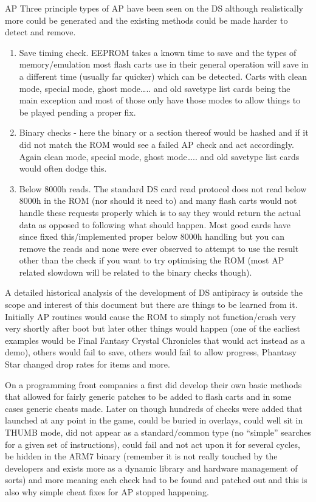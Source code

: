 \documentclass[
]{book}
\providecommand{\tightlist}{%
  \setlength{\itemsep}{0pt}\setlength{\parskip}{0pt}}
\begin{document}
AP Three principle types of AP have been seen on the DS although realistically more could be generated and the existing methods could be made harder to detect and remove.

\begin{enumerate}
\def\labelenumi{\arabic{enumi}.}
\tightlist
\item
  Save timing check. EEPROM takes a known time to save and the types of memory/emulation most flash carts use in their general operation will save in a different time (usually far quicker) which can be detected. Carts with clean mode, special mode, ghost mode\ldots.. and old savetype list cards being the main exception and most of those only have those modes to allow things to be played pending a proper fix.
\item
  Binary checks - here the binary or a section thereof would be hashed and if it did not match the ROM would see a failed AP check and act accordingly. Again clean mode, special mode, ghost mode\ldots.. and old savetype list cards would often dodge this.
\item
  Below 8000h reads. The standard DS card read protocol does not read below 8000h in the ROM (nor should it need to) and many flash carts would not handle these requests properly which is to say they would return the actual data as opposed to following what should happen. Most good cards have since fixed this/implemented proper below 8000h handling but you can remove the reads and none were ever observed to attempt to use the result other than the check if you want to try optimising the ROM (most AP related slowdown will be related to the binary checks though).
\end{enumerate}

A detailed historical analysis of the development of DS antipiracy is outside the scope and interest of this document but there are things to be learned from it. Initially AP routines would cause the ROM to simply not function/crash very very shortly after boot but later other things would happen (one of the earliest examples would be Final Fantasy Crystal Chronicles that would act instead as a demo), others would fail to save, others would fail to allow progress, Phantasy Star changed drop rates for items and more.

On a programming front companies a first did develop their own basic methods that allowed for fairly generic patches to be added to flash carts and in some cases generic cheats made. Later on though hundreds of checks were added that launched at any point in the game, could be buried in overlays, could well sit in THUMB mode, did not appear as a standard/common type (no ``simple'' searches for a given set of instructions), could fail and not act upon it for several cycles, be hidden in the ARM7 binary (remember it is not really touched by the developers and exists more as a dynamic library and hardware management of sorts) and more meaning each check had to be found and patched out and this is also why simple cheat fixes for AP stopped happening.
\end{document}
